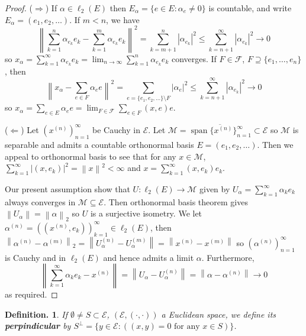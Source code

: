 \documentclass[11pt, a4paper]{memoir}
\newcommand{\impr}{{($\Longrightarrow$)\hspace{0.2cm}}}
\newcommand{\impl}{{($\Longleftarrow$)\hspace{0.2cm}}}
\newcommand{\norm}[1]{\ensuremath{\left\lVert#1\right\rVert}}
\theoremstyle{change}
\theoremstyle{plain}
\theoremstyle{nonumberplain}
\newtheorem{definition}{Definition.}
\newtheorem{proof}{Proof}
\DeclareMathOperator{\spn}{span}
\newcommand{\inr}[1]{\ensuremath{\left(#1\right)}}
\numberwithin{equation}{section}
\begin{document}
\begin{proof}
    \impr
    If $\alpha\in\ell_2(E)$ then $E_\alpha=\{e\in E:\alpha_e\neq 0\}$ is countable, and write $E_\alpha=(e_1,e_2,\ldots)$.
    If $m<n$, we have
    \begin{equation*}
        \norm{\sum_{k=1}^n\alpha_{e_k}e_k-\sum_{k=1}^m\alpha_{e_k}e_k}^2=\sum_{k=m+1}^n|\alpha_{e_k}|^2\leq\sum_{k=n+1}^\infty|\alpha_{e_k}|^2\to 0
    \end{equation*}
    so $x_\alpha=\sum_{k=1}^\infty \alpha_{e_k}e_k=\lim_{n\to\infty}\sum_{k=1}^n\alpha_{e_k}e_k$ converges.
    If $F\in\mathcal{F}$, $F\supseteq\{e_1,\ldots,e_n\}$, then
    \begin{equation*}
        \norm{x_\alpha-\sum_{e\in F}\alpha_ee}^2=\sum_{e=\{e_1,e_2,\ldots\}\setminus F}|\alpha_e|^2\leq\sum_{k=n+1}^\infty |\alpha_{e_k}|^2\to 0
    \end{equation*}
    so $x_\alpha=\sum_{e\in E}\alpha_ee=\lim_{F\in\mathcal{F}}\sum_{e\in F}\inr{x,e}e$.

    \impl
    Let $(x^{(n)})_{n=1}^\infty$ be Cauchy in $\mathcal{E}$.
    Let $\mathcal{M}=\overline{\spn\{x^{(n)}\}_{n=1}^\infty}\subset\mathcal{E}$ so $\mathcal{M}$ is separable and admits a countable orthonormal basis $E=(e_1,e_2,\ldots)$.
    Then we appeal to orthonormal basis to see that for any $x\in\mathcal{M}$, $\sum_{k=1}^\infty|\inr{x,e_k}|^2=\norm{x}^2<\infty$ and $x=\sum_{k=1}^\infty\inr{x,e_k}e_k$.

    Our present assumption show that $U:\ell_2(E)\to\mathcal{M}$ given by $U_\alpha=\sum_{k=1}^\infty \alpha_ke_k$ always converges in $\mathcal{M}\subseteq\mathcal{E}$.
    Then orthonormal basis theorem gives $\norm{U_\alpha}=\norm{\alpha}_2$ so $U$ is a surjective isometry.
    We let $\alpha^{(n)}=((x^{(n)},e_k))_{k=1}^\infty\in\ell_2(E)$, then $\norm{\alpha^{(n)}-\alpha^{(m)}}_2=\norm{U_\alpha^{(n)}-U_\alpha^{(m)}}=\norm{x^{(n)}-x^{(m)}}$ so $(\alpha^{(n)})_{n=1}^\infty$ is Cauchy and in $\ell_2(E)$ and hence admits a limit $\alpha$.
    Furthermore,
    \begin{equation*}
        \norm{\sum_{k=1}^\infty\alpha_ke_k-x^{(n)}}=\norm{U_\alpha-U_\alpha^{(n)}}=\norm{\alpha-\alpha^{(n)}}\to 0
    \end{equation*}
    as required.
\end{proof}
\begin{definition}
    If $\emptyset\neq S\subset\mathcal{E}$, $(\mathcal{E},\inr{\cdot,\cdot})$ a Euclidean space, we define its \textbf{perpindicular} by $S^\perp=\{y\in\mathcal{E}:(\inr{x,y}=0\text{ for any }x\in S)\}$.
\end{definition}
\end{document}
